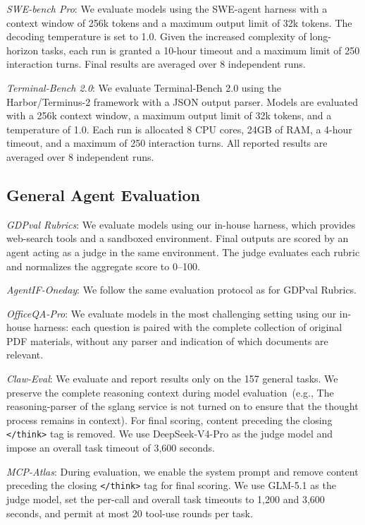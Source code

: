 \emph{SWE-bench Pro}: We evaluate models using the SWE-agent harness with a context window of 256k tokens and a maximum output limit of 32k tokens. The decoding temperature is set to 1.0. Given the increased complexity of long-horizon tasks, each run is granted a 10-hour timeout and a maximum limit of 250 interaction turns. Final results are averaged over 8 independent runs.

\emph{Terminal-Bench 2.0}: We evaluate Terminal-Bench 2.0 using the Harbor/Terminus-2 framework with a JSON output parser. Models are evaluated with a 256k context window, a maximum output limit of 32k tokens, and a temperature of 1.0. Each run is allocated 8 CPU cores, 24GB of RAM, a 4-hour timeout, and a maximum of 250 interaction turns. All reported results are averaged over 8 independent runs.

\subsection{General Agent Evaluation}

\emph{GDPval Rubrics}: We evaluate models using our in-house harness, which provides web-search tools and a sandboxed environment. Final outputs are scored by an agent acting as a judge in the same environment. The judge evaluates each rubric and normalizes the aggregate score to 0--100.

\emph{AgentIF-Oneday}: We follow the same evaluation protocol as for GDPval Rubrics.

\emph{OfficeQA-Pro}: We evaluate models in the most challenging setting using our in-house harness: each question is paired with the complete collection of original PDF materials, without any parser and indication of which documents are relevant.

\emph{Claw-Eval}: 
We evaluate and report results only on the 157 general tasks.
We preserve the complete reasoning context during model evaluation~(e.g., The reasoning-parser of the sglang service is not turned on to ensure that the thought process remains in context). For final scoring, content preceding the closing \texttt{</think>} tag is removed. We use DeepSeek-V4-Pro as the judge model and impose an overall task timeout of 3,600 seconds.

\emph{MCP-Atlas}: During evaluation, we enable the system prompt and remove content preceding the closing \texttt{</think>} tag for final scoring. We use GLM-5.1 as the judge model, set the per-call and overall task timeouts to 1,200 and 3,600 seconds, and permit at most 20 tool-use rounds per task.


